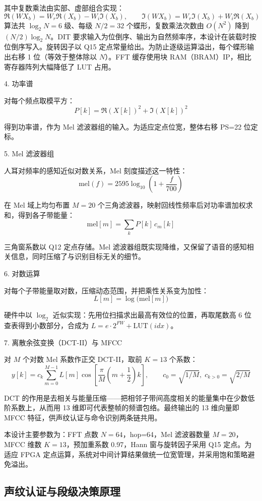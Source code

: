 \documentclass[UTF8,zihao=-4,fontset=windows]{ctexart}
\newcommand{\code}[1]{{\ttfamily #1}}
\newcommand{\subhead}[1]{%
  \par\medskip
  {\heiti\zihao{-4}#1}
  \nopagebreak
  \par\smallskip
}
\begin{document}
其中复数乘法由实部、虚部组合实现：
\[
\Re(WX_b)=W_r\Re(X_b)-W_i\Im(X_b),\qquad \Im(WX_b)=W_r\Im(X_b)+W_i\Re(X_b)
\]
算法共 $\log_2N=6$ 级、每级 $N/2=32$ 个蝶形，复数乘法次数由 $O(N^2)$ 降到 $(N/2)\log_2N$。DIT 要求输入为位倒序、输出为自然频率序，本设计在装载时按位倒序写入。旋转因子以 Q15 定点常量给出。为防止逐级运算溢出，每个蝶形输出右移 1 位（等效于整体除以 $N$）。FFT 缓存使用块 RAM（BRAM）IP，相比寄存器阵列大幅降低了 LUT 占用。

\subhead{4. 功率谱}

对每个频点取模平方：
\[
P[k]=\Re(X[k])^2+\Im(X[k])^2
\]

得到功率谱，作为 Mel 滤波器组的输入。为适应定点位宽，整体右移 \code{PS}=22 位定标。

\subhead{5. Mel 滤波器组}

人耳对频率的感知近似对数关系，Mel 刻度描述这一特性：
\[
\mathrm{mel}(f)=2595\log_{10}\!\left(1+\frac{f}{700}\right)
\]

在 Mel 域上均匀布置 $M=20$ 个三角滤波器，映射回线性频率后对功率谱加权求和，得到各子带能量：
\[
\mathrm{mel}[m]=\sum_{k}P[k]\,c_m[k]
\]

三角窗系数以 Q12 定点存储。Mel 滤波器组既实现降维，又保留了语音的感知相关信息，同时压缩了与识别目标无关的细节。

\subhead{6. 对数运算}

对每个子带能量取对数，压缩动态范围，并把乘性关系变为加性：
\[
L[m]=\log\big(\mathrm{mel}[m]\big)
\]

硬件中以 $\log_2$ 近似实现：先用位扫描求出最高有效位的位置，再取尾数高 6 位查表得到小数部分，合成为 $L=e\cdot 2^{FW}+\mathrm{LUT}(idx)$。

\subhead{7. 离散余弦变换（DCT-II）与 MFCC}

对 $M$ 个对数 Mel 系数作正交 DCT-II，取前 $K=13$ 个系数：
\[
y[k]=c_k\sum_{m=0}^{M-1}L[m]\cos\!\left[\frac{\pi}{M}\left(m+\frac12\right)k\right],\qquad c_0=\sqrt{1/M},\;c_{k>0}=\sqrt{2/M}
\]

DCT 的作用是去相关与能量压缩——把相邻子带间高度相关的能量集中在少数低阶系数上，从而用 13 维即可代表整帧的频谱包络。最终输出的 13 维向量即 MFCC 特征，供声纹认证与命令识别两条链共用。

本设计主要参数为：FFT 点数 $N=64$，\code{hop}=64，Mel 滤波器数量 $M=20$，MFCC 维数 $K=13$，预加重系数 0.97，Hann 窗与旋转因子采用 Q15 定点。为适应 FPGA 定点运算，系统对中间计算结果做统一位宽管理，并采用饱和策略避免溢出。

\subsection{声纹认证与段级决策原理}
\end{document}
